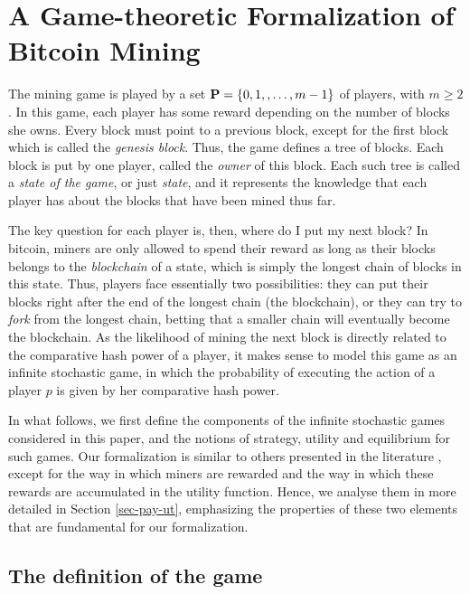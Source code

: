
\section{A Game-theoretic Formalization of Bitcoin Mining}
\label{sec-formalization}

The mining game is played by a set $\mathbf{P} = \{0, 1, , \ldots, m-1\}$ of players, with $m \geq 2$.
In this game, each player has some reward depending on the number of blocks she owns. Every block must point to a previous block, except for the first block which is called the {\em genesis block}. Thus, the game defines a tree of blocks. Each block is put by one player, called the {\em owner} of this block. Each such tree is called a {\em state of the game}, or just {\em state}, and it represents the knowledge that each player has about the blocks that have been mined thus far.

The key question for each player is, then, where do I put my next block? In bitcoin, miners are only allowed to spend their reward as long
as their blocks belongs to the \emph{blockchain} of a state, which is simply the longest chain of blocks in this state. Thus, players face essentially two possibilities: they can put their blocks right after the end of the longest chain (the blockchain), or they can try to \emph{fork}
from the longest chain, betting that a smaller chain will eventually become the blockchain. As the likelihood of
mining the next block is directly related to the comparative hash power of a player, it makes sense to model this game as an infinite
stochastic game, in which the probability of executing the action of a player $p$ is given by her comparative hash power.

In what follows, we first define the components of the infinite stochastic games considered in this paper, and the notions of strategy, utility  and equilibrium for such games. Our formalization is similar to others presented in the literature \cite{mininggames:2016}, except for the way in which miners are rewarded and the way in which these rewards are accumulated in the utility function. Hence, we analyse them in more detailed in Section \ref{sec-pay-ut}, emphasizing the properties of these two elements that are fundamental for our formalization.


\subsection{The definition of the game}
